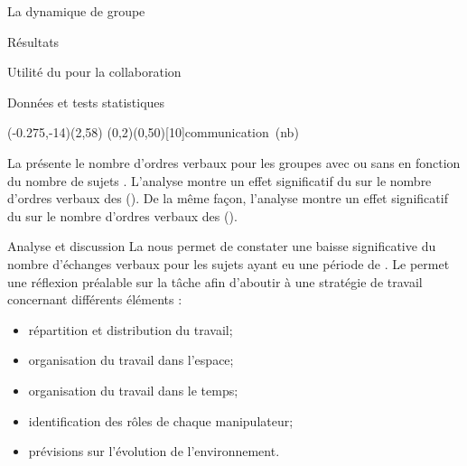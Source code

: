 \documentclass[myfrancais,ngerman,english,frenchb]{mythesis}
\begin{document}
\begin{mychapter}{La dynamique de groupe}
\begin{mysection}{Résultats}
\begin{mysubsection}{Utilité du \mybrainstorming pour la collaboration}
\begin{mysubsubsection}{Données et tests statistiques}
					\begin{myfigure}
						\begin{myps}(-0.275,-14)(2,58)
							\myaxes(0,2){\mybrainstorming}(0,50)[10]{communication~(nb)}
						\end{myps}
					\end{myfigure}

					La  présente le nombre d'ordres verbaux  pour les groupes avec ou sans \mybrainstorming {} en fonction du nombre de sujets .
					L'analyse montre un effet significatif du \mybrainstorming {} sur le nombre d'ordres verbaux  des  ().
					De la même façon, l'analyse montre un effet significatif du \mybrainstorming {} sur le nombre d'ordres verbaux  des  ().
				\end{mysubsubsection}
				\begin{mysubsubsection}{Analyse et discussion}
					La  nous permet de constater une baisse significative du nombre d'échanges verbaux pour les sujets ayant eu une période de \mybrainstorming.
					Le \mybrainstorming permet une réflexion préalable sur la tâche afin d'aboutir à une stratégie de travail concernant différents éléments :
					\begin{itemize}
						\item répartition et distribution du travail;
						\item organisation du travail dans l'espace;
						\item organisation du travail dans le temps;
						\item identification des rôles de chaque manipulateur;
						\item prévisions sur l'évolution de l'environnement.
					\end{itemize}


\end{mysubsubsection}
\end{mysubsection}
\end{mysection}
\end{mychapter}
\end{document}

